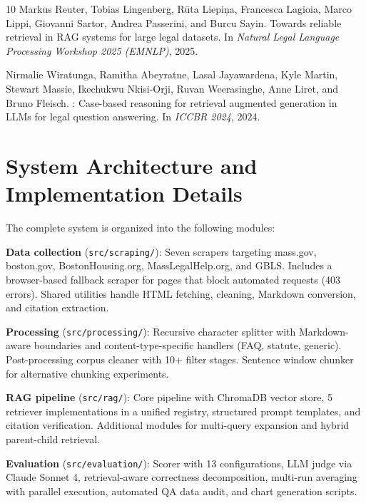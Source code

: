 \documentclass{article}
\begin{document}
{\begin{thebibliography}{10}
Markus Reuter, Tobias Lingenberg, R\={u}ta Liepi\c{n}a, Francesca Lagioia, Marco Lippi, Giovanni Sartor, Andrea Passerini, and Burcu Sayin.
\newblock Towards reliable retrieval in {RAG} systems for large legal datasets.
\newblock In \emph{Natural Legal Language Processing Workshop 2025 (EMNLP)}, 2025.

Nirmalie Wiratunga, Ramitha Abeyratne, Lasal Jayawardena, Kyle Martin, Stewart Massie, Ikechukwu Nkisi-Orji, Ruvan Weerasinghe, Anne Liret, and Bruno Fleisch.
: Case-based reasoning for retrieval augmented generation in {LLMs} for legal question answering.
\newblock In \emph{ICCBR 2024}, 2024.

\end{thebibliography}
}


\appendix

\section{System Architecture and Implementation Details}

The complete system is organized into the following modules:

\textbf{Data collection} (\texttt{src/scraping/}): Seven scrapers targeting mass.gov, boston.gov, BostonHousing.org, MassLegalHelp.org, and GBLS. Includes a browser-based fallback scraper for pages that block automated requests (403 errors). Shared utilities handle HTML fetching, cleaning, Markdown conversion, and citation extraction.

\textbf{Processing} (\texttt{src/processing/}): Recursive character splitter with Markdown-aware boundaries and content-type-specific handlers (FAQ, statute, generic). Post-processing corpus cleaner with 10+ filter stages. Sentence window chunker for alternative chunking experiments.

\textbf{RAG pipeline} (\texttt{src/rag/}): Core pipeline with ChromaDB vector store, 5 retriever implementations in a unified registry, structured prompt templates, and citation verification. Additional modules for multi-query expansion and hybrid parent-child retrieval.

\textbf{Evaluation} (\texttt{src/evaluation/}): Scorer with 13 configurations, LLM judge via Claude Sonnet 4, retrieval-aware correctness decomposition, multi-run averaging with parallel execution, automated QA data audit, and chart generation scripts.
\end{document}
